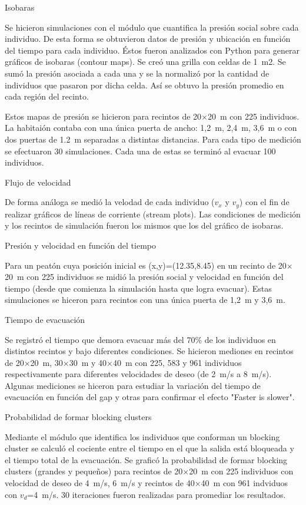 {\Large Isobaras}

Se hicieron simulaciones con el módulo que cuantifica la presión social sobre cada individuo. De esta forma se obtuvieron datos de presión y ubicación en función del tiempo para cada individuo. Éstos fueron analizados con Python para generar gráficos de isobaras (contour maps).  Se creó una grilla con celdas de 1~m2. Se sumó la presión asociada a cada una y se la normalizó por la cantidad de individuos que pasaron por dicha celda. Así se obtuvo la presión promedio en cada región del recinto.   

Estos mapas de presión se hicieron para recintos de 20$\times$20~m con 225 individuos. La habitaión contaba con una única puerta de ancho: 1,2~m, 2,4~m, 3,6~m o con dos puertas de 1.2~m separadas a distintas distancias. Para cada tipo de medición se efectuaron 30 simulaciones. Cada una de estas se terminó al evacuar 100 individuos. 

{\Large Flujo de velocidad}

De forma análoga se medió la velodad de cada individuo ($v_x$ y $v_y$) con el fin de realizar gráficos de líneas de corriente (stream plots). Las condiciones de medición y los recintos de simulación fueron los mismos que los del gráfico de isobaras. 

{\Large Presión y velocidad en función del tiempo}

Para un peatón cuya posición inicial es (x,y)=(12.35,8.45) en un recinto de 20$\times$20~m con 225 individuos se midió la presión social y velocidad en función del tiempo (desde que comienza la simulación hasta que logra evacuar). Estas simulaciones se hiceron para recintos con una única puerta de 1,2~m y 3,6~m. 

{\Large Tiempo de evacuación}

Se registró el tiempo que demora evacuar más del 70\% de los individuos en distintos recintos y bajo diferentes condiciones. Se hicieron mediones en recintos de 20$\times$20~m, 30$\times$30~m y 40$\times$40~m con 225, 583 y 961 individuos respectivamente para diferentes velocidades de deseo (de 2~m/s a 8~m/s). Algunas mediciones se hiceron para estudiar la variación del tiempo de evacuación en función del gap y otras para confirmar el efecto "Faster is slower". 

{\Large Probabilidad de formar blocking clusters}

Mediante el módulo que identifica los individuos que conforman un blocking cluster se calculó el cociente entre el tiempo en el que la salida está bloqueada y el tiempo total de la evacuación. Se graficó la probabilidad de formar blocking clusters (grandes y pequeños) para recintos de 20$\times$20~m con 225 individuos con velocidad de deseo de 4~m/s, 6~m/s y recintos de 40$\times$40~m con 961 indviduos con $v_d$=4~m/s. 30 iteraciones fueron realizadas para promediar los resultados. 


